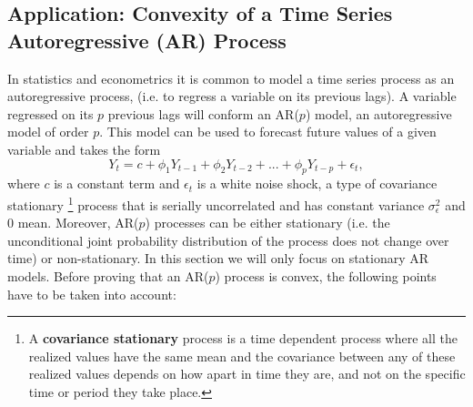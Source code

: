 \documentclass{article}
\begin{document}
\subsection{Application: Convexity of a Time Series Autoregressive (AR) Process}

In statistics and econometrics it is common to model a time series process as an autoregressive process, (i.e. to regress a variable on its previous lags). A variable regressed on its $p$ previous lags will conform an AR($p$) model, an autoregressive model of order $p$. This model can be used to forecast future values of a given variable and takes the form
\[
Y_t = c + \phi_1Y_{t-1} + \phi_2Y_{t-2} + ... + \phi_pY_{t-p} + \epsilon_t,\]
where $c$ is a constant term and $\epsilon_t$ is a white noise shock, a type of covariance stationary \footnote{A \textbf{covariance stationary} process is a time dependent process where all the realized values have the same mean and the covariance between any of these realized values depends on how apart in time they are, and not on the specific time or period they take place.} process that is serially uncorrelated and has constant variance $\sigma_{\epsilon}^2$ and 0 mean. Moreover, AR($p$) processes can be either stationary (i.e. the unconditional joint probability distribution of the process does not change over time) or non-stationary. In this section we will only focus on stationary AR models. Before proving that an AR($p$) process is convex, the following points have to be taken into account:
\end{document}
